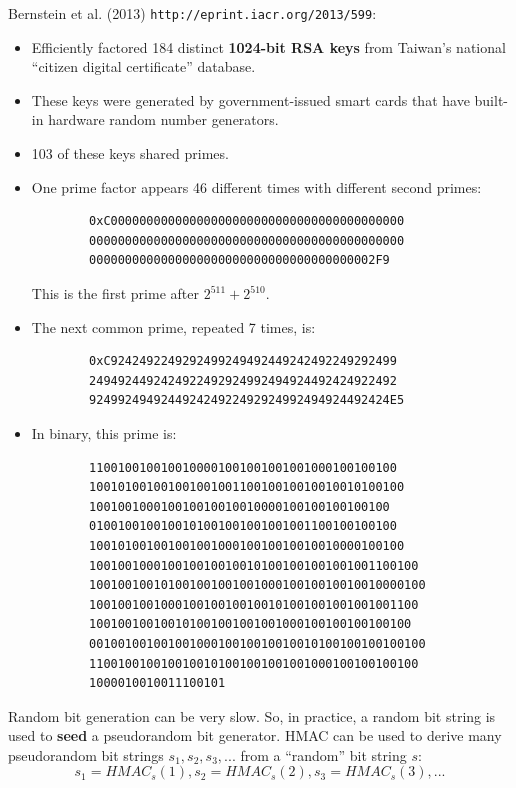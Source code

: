 \documentclass[12pt,titlepage]{article}
\begin{document}
Bernstein et al. (2013) \texttt{http://eprint.iacr.org/2013/599}: \begin{itemize}
	\item Efficiently factored 184 distinct \textbf{1024-bit RSA keys} from Taiwan’s national ``citizen digital certificate'' database.
	\item These keys were generated by government-issued smart cards that have built-in hardware random number generators.
	\item 103 of these keys shared primes.
	\item One prime factor appears 46 different times with different second primes:\begin{verbatim}
		0xC00000000000000000000000000000000000000000
		00000000000000000000000000000000000000000000
		0000000000000000000000000000000000000002F9
	\end{verbatim}
	This is the first prime after $2^{511} + 2^{510}$.
	\item The next common prime, repeated 7 times, is:\begin{verbatim}
		0xC9242492249292499249492449242492249292499
		2494924492424922492924992494924492424922492
		924992494924492424922492924992494924492424E5
	\end{verbatim}
	\item In binary, this prime is:\begin{verbatim}
		1100100100100100001001001001001000100100100
		10010100100100100100110010010010010010100100
		100100100010010010010010000100100100100100
		0100100100100101001001001001001100100100100
		10010100100100100100010010010010010000100100
		1001001000100100100100101001001001001001100100
		10010010010100100100100100010010010010010000100
		1001001001000100100100100101001001001001001100
		100100100100101001001001001000100100100100100
		00100100100100100010010010010010100100100100100
		1100100100100100101001001001001000100100100100
		1000010010011100101
	\end{verbatim}
\end{itemize}
Random bit generation can be very slow. So, in practice, a random bit string is used to \textbf{seed} a pseudorandom bit generator.
HMAC can be used to derive many pseudorandom bit strings $s_1, s_2, s_3, ...$ from a ``random'' bit string $s$:
$$s_1 = HMAC_s (1), s_2 = HMAC_s (2), s_3 = HMAC_s (3), ...$$

\end{document}
